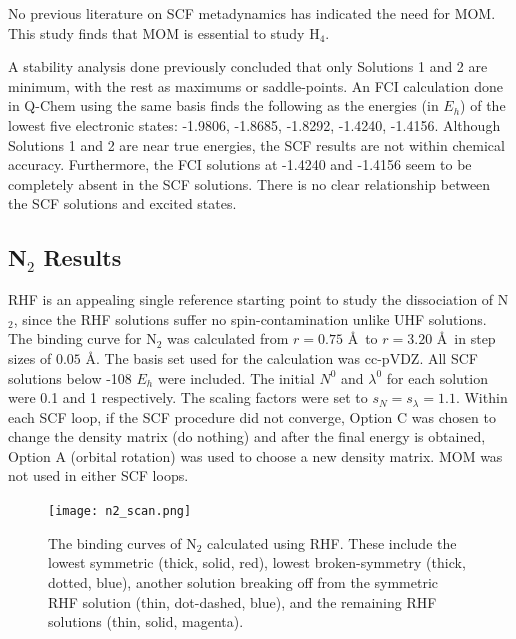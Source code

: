 \documentclass[final,3p,times,twocolumn]{elsarticle}
\begin{document}
No previous literature on SCF metadynamics has indicated the need for MOM. This study finds that MOM is essential to study H$_4$. %

A stability analysis done previously concluded that only Solutions 1 and 2 are minimum, with the rest as maximums or saddle-points. An FCI calculation done in Q-Chem\cite{qchem} using the same basis finds the following as the energies (in $E_h$) of the lowest five electronic states: -1.9806, -1.8685, -1.8292, -1.4240, -1.4156. Although Solutions 1 and 2 are near true energies, the SCF results are not within chemical accuracy. Furthermore, the FCI solutions at -1.4240 and -1.4156 seem to be completely absent in the SCF solutions. There is no clear relationship between the SCF solutions and excited states.

\subsection{N$_2$ Results} \label{sec:n2results}
RHF is an appealing single reference starting point to study the dissociation of N$_2$, since the RHF solutions suffer no spin-contamination unlike UHF solutions. The binding curve for N$_2$ was calculated from $r = 0.75$ \AA\ to $r = 3.20$ \AA\ in step sizes of $0.05$ \AA. The basis set used for the calculation was cc-pVDZ\cite{dunning}. All SCF solutions below -108 $E_h$ were included. The initial $N^0$ and $\lambda^0$ for each solution were 0.1 and 1 respectively. The scaling factors were set to $s_N = s_\lambda = 1.1$. Within each SCF loop, if the SCF procedure did not converge, Option C was chosen to change the density matrix (do nothing) and after the final energy is obtained, Option A (orbital rotation) was used to choose a new density matrix. MOM was not used in either SCF loops.

\begin{figure}
\texttt{[image: n2\_scan.png]}
\caption{The binding curves of N$_2$ calculated using RHF. These include the lowest symmetric (thick, solid, red), lowest broken-symmetry (thick, dotted, blue), another solution breaking off from the symmetric RHF solution (thin, dot-dashed, blue), and the remaining RHF solutions (thin, solid, magenta).}
\label{fig:n2plot}
\end{figure}
\end{document}
